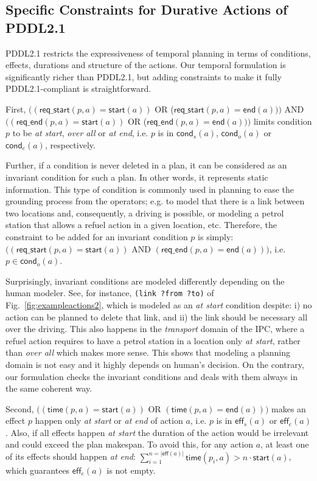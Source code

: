 \documentclass[runningheads]{llncs}
\newcommand{\eff}{\mathsf{eff}}    %
\newcommand{\cond}{\mathsf{cond}}  %
\newcommand{\start}{\mathsf{start}}%
\newcommand{\en}{\mathsf{end}}     %
\newcommand{\tim}{\mathsf{time}}   %
\newcommand{\reqs}{\mathsf{req\_{start}}} %
\newcommand{\reqe}{\mathsf{req\_{end}}}   %
\begin{document}
\subsection{Specific Constraints for Durative Actions of PDDL2.1}
\label{sec:PDDL21constraints}

PDDL2.1 restricts the expressiveness of temporal planning in terms of conditions, effects, durations and structure of the actions. Our temporal formulation is significantly richer than PDDL2.1, but adding constraints to make it fully PDDL2.1-compliant is straightforward.

First, $((\reqs(p,a) = \start(a))$ OR ($\reqs(p,a) = \en(a)))$ AND $((\reqe(p,a) = \start(a))$ OR ($\reqe(p,a) = \en(a)))$ limits condition $p$ to be \emph{at start}, \emph{over all} or \emph{at end}, i.e. $p$ is in $\cond_s(a)$, $\cond_o(a)$ or $\cond_e(a)$, respectively.

Further, if a condition is never deleted in a plan, it can be considered as an invariant condition for such a plan. In other words, it represents static information. This type of condition is commonly used in planning to ease the grounding process from the operators; e.g. to model that there is a link between two locations and, consequently, a driving is possible, or modeling a petrol station that allows a refuel action in a given location, etc. Therefore, the constraint to be added for an invariant condition $p$ is simply: $((\reqs(p,a) = \start(a))$ AND $(\reqe(p,a) = \en(a)))$, i.e. $p \in \cond_o(a)$.

Surprisingly, invariant conditions are modeled differently depending on the human modeler. See, for instance, \texttt{(link ?from ?to)} of Fig.~\ref{fig:exampleactions2}, which is modeled as an \emph{at start} condition despite: i) no action can be planned to delete that link, and ii) the link should be necessary all over the driving. This also happens in the \emph{transport} domain of the IPC, where a refuel action requires to have a petrol station in a location only \emph{at start}, rather than \emph{over all} which makes more sense. This shows that modeling a planning domain is not easy and it highly depends on human's decision. On the contrary, our formulation checks the invariant conditions and deals with them always in the same coherent way.

Second, $((\tim(p,a) = \start(a))$ OR $(\tim(p,a) = \en(a)))$ makes an effect $p$ happen only \emph{at start} or \emph{at end} of action $a$, i.e. $p$ is in $\eff_s(a)$ or $\eff_e(a)$.
Also, if all effects happen \emph{at start} the duration of the action would be irrelevant and could exceed the plan makespan. To avoid this, for any action $a$, at least one of its effects should happen \emph{at end}: $\sum_{i=1}^{n =|\eff(a)|} \tim(p_i,a) > n \cdot \start(a)$, which guarantees $\eff_e(a)$ is not empty.
\end{document}
